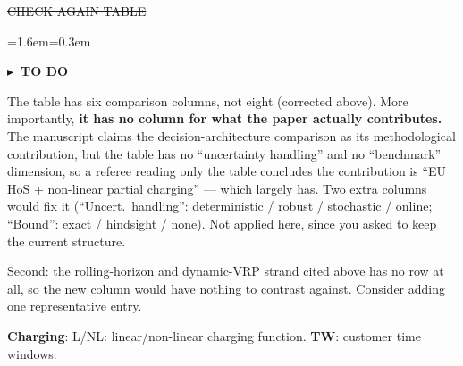 \documentclass[preprint,12pt,3p]{elsarticle}
\newcommand{\DEL}[1]{{\color{anngray}\sout{#1}}}
\newenvironment{ann}[2]{%
  \par\addvspace{4pt}%
  \begin{list}{}{\leftmargin=1.6em\rightmargin=0.3em\topsep=0pt\parsep=3pt\itemsep=0pt\listparindent=0pt}%
  \item[]\color{#1}\small\textbf{\textsf{#2}}\par\nopagebreak\vspace{1pt}\color{#1}\small\ignorespaces}
  {\end{list}\addvspace{4pt}}
\newenvironment{atodo}{\begin{ann}{annblue}{$\blacktriangleright$\ TO DO}}{\end{ann}}
\begin{document}
\DEL{CHECK AGAIN TABLE}

\begin{atodo}
The table has six comparison columns, not eight (corrected above). More
importantly, \textbf{it has no column for what the paper actually contributes.}
The manuscript claims the decision-architecture comparison as its methodological
contribution, but the table has no ``uncertainty handling'' and no ``benchmark''
dimension, so a referee reading only the table concludes the contribution is
``EU HoS + non-linear partial charging'' --- which
\citet{brockmann_break-and-charge_2025} largely has. Two extra columns would fix
it (``Uncert.\ handling'': deterministic / robust / stochastic / online;
``Bound'': exact / hindsight / none). Not applied here, since you asked to keep
the current structure.

\medskip
Second: the rolling-horizon and dynamic-VRP strand cited above has no row at all,
so the new column would have nothing to contrast against. Consider adding one
representative entry.
\end{atodo}

\begin{table}[htbp]
\centering
\caption{Positioning of the present work in the literature.}
\label{tab:litreview}
\scriptsize
\setlength{\tabcolsep}{3.5pt}
\par\smallskip
\begin{minipage}{\textwidth}
\footnotesize
\textbf{Charging}: L/NL: linear/non-linear charging function.
\textbf{TW}: customer time windows.
\end{minipage}
\end{table}
\end{document}
